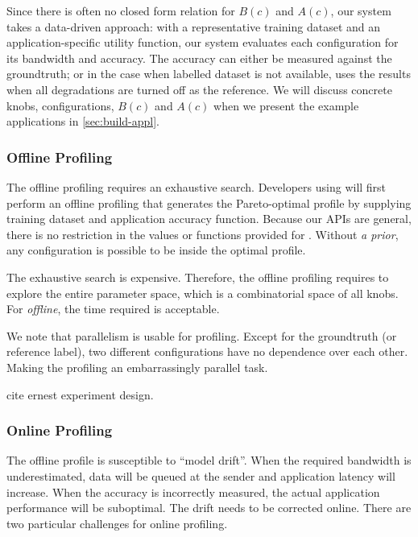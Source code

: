 Since there is often no closed form relation for $B(c)$ and $A(c)$, our system
takes a data-driven approach: with a representative training dataset and an
application-specific utility function, our system evaluates each configuration
for its bandwidth and accuracy. The accuracy can either be measured against the
groundtruth; or in the case when labelled dataset is not available, \sysname{}
uses the results when all degradations are turned off as the reference. We will
discuss concrete knobs, configurations, $B(c)$ and $A(c)$ when we present the
example applications in \autoref{sec:build-appl}.

\subsubsection{Offline Profiling}
\label{sec:offline-profiling}

The offline profiling requires an exhaustive search. Developers using \sysname{}
will first perform an offline profiling that generates the Pareto-optimal
profile by supplying training dataset and application accuracy function. Because
our APIs are general, there is no restriction in the values or functions
provided for \maybe{}. Without \textit{a prior}, any configuration is possible
to be inside the optimal profile.

The exhaustive search is expensive. Therefore, the offline profiling requires to
explore the entire parameter space, which is a combinatorial space of all
knobs. For \textit{offline}, the time required is acceptable.

We note that parallelism is usable for profiling. Except for the groundtruth (or
reference label), two different configurations have no dependence over each
other. Making the profiling an embarrassingly parallel task.

cite ernest experiment design.

\subsubsection{Online Profiling}
\label{sec:online-profiling}

The offline profile is susceptible to ``model drift''. When the required
bandwidth is underestimated, data will be queued at the sender and application
latency will increase. When the accuracy is incorrectly measured, the actual
application performance will be suboptimal. The drift needs to be corrected
online. There are two particular challenges for online profiling.

